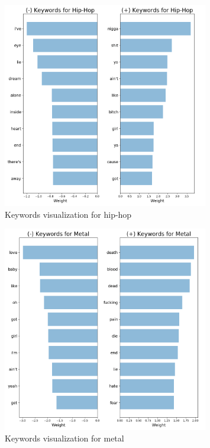 \documentclass[a4paper,11pt]{article}
\begin{document}
\begin{figure}[h]
\begin{center}
\includegraphics[width=0.8\textwidth]{./img/hip-hop-keywords.png}
\end{center}
\caption{Keywords visualization for hip-hop}
\label{label-kw-hip-hop}
\end{figure}

\begin{figure}[h]
\begin{center}
\includegraphics[width=0.8\textwidth]{./img/metal-keywords.png}
\end{center}
\caption{Keywords visualization for metal}
\label{label-kw-metal}
\end{figure}

\end{document}
